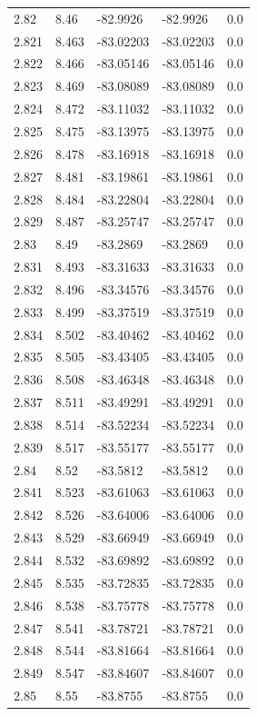 \begin{tabular}{lllll}
2.82 & 8.46 & -82.9926 & -82.9926 & 0.0 \\
2.821 & 8.463 & -83.02203 & -83.02203 & 0.0 \\
2.822 & 8.466 & -83.05146 & -83.05146 & 0.0 \\
2.823 & 8.469 & -83.08089 & -83.08089 & 0.0 \\
2.824 & 8.472 & -83.11032 & -83.11032 & 0.0 \\
2.825 & 8.475 & -83.13975 & -83.13975 & 0.0 \\
2.826 & 8.478 & -83.16918 & -83.16918 & 0.0 \\
2.827 & 8.481 & -83.19861 & -83.19861 & 0.0 \\
2.828 & 8.484 & -83.22804 & -83.22804 & 0.0 \\
2.829 & 8.487 & -83.25747 & -83.25747 & 0.0 \\
2.83 & 8.49 & -83.2869 & -83.2869 & 0.0 \\
2.831 & 8.493 & -83.31633 & -83.31633 & 0.0 \\
2.832 & 8.496 & -83.34576 & -83.34576 & 0.0 \\
2.833 & 8.499 & -83.37519 & -83.37519 & 0.0 \\
2.834 & 8.502 & -83.40462 & -83.40462 & 0.0 \\
2.835 & 8.505 & -83.43405 & -83.43405 & 0.0 \\
2.836 & 8.508 & -83.46348 & -83.46348 & 0.0 \\
2.837 & 8.511 & -83.49291 & -83.49291 & 0.0 \\
2.838 & 8.514 & -83.52234 & -83.52234 & 0.0 \\
2.839 & 8.517 & -83.55177 & -83.55177 & 0.0 \\
2.84 & 8.52 & -83.5812 & -83.5812 & 0.0 \\
2.841 & 8.523 & -83.61063 & -83.61063 & 0.0 \\
2.842 & 8.526 & -83.64006 & -83.64006 & 0.0 \\
2.843 & 8.529 & -83.66949 & -83.66949 & 0.0 \\
2.844 & 8.532 & -83.69892 & -83.69892 & 0.0 \\
2.845 & 8.535 & -83.72835 & -83.72835 & 0.0 \\
2.846 & 8.538 & -83.75778 & -83.75778 & 0.0 \\
2.847 & 8.541 & -83.78721 & -83.78721 & 0.0 \\
2.848 & 8.544 & -83.81664 & -83.81664 & 0.0 \\
2.849 & 8.547 & -83.84607 & -83.84607 & 0.0 \\
2.85 & 8.55 & -83.8755 & -83.8755 & 0.0 \\

\end{tabular}
